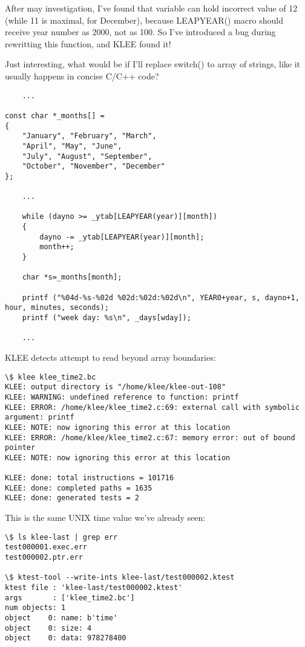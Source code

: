 After may investigation, I've found that  variable can hold incorrect value of 12 (while 11 is maximal, for December), 
because LEAPYEAR() macro should receive year number as 2000, not as 100.
So I've introduced a bug during rewritting this function, and KLEE found it!

Just interesting, what would be if I'll replace switch() to array of strings, like it usually happens in concise C/C++ code?

\begin{lstlisting}
	...

const char *_months[] =
{
	"January", "February", "March",
	"April", "May", "June",
	"July", "August", "September",
	"October", "November", "December"
};

	...

	while (dayno >= _ytab[LEAPYEAR(year)][month])
	{
		dayno -= _ytab[LEAPYEAR(year)][month];
		month++;
	}
	
	char *s=_months[month];

	printf ("%04d-%s-%02d %02d:%02d:%02d\n", YEAR0+year, s, dayno+1, hour, minutes, seconds);
	printf ("week day: %s\n", _days[wday]);	
	
	...

\end{lstlisting}

KLEE detects attempt to read beyond array boundaries:

\begin{lstlisting}
\$ klee klee_time2.bc
KLEE: output directory is "/home/klee/klee-out-108"
KLEE: WARNING: undefined reference to function: printf
KLEE: ERROR: /home/klee/klee_time2.c:69: external call with symbolic argument: printf
KLEE: NOTE: now ignoring this error at this location
KLEE: ERROR: /home/klee/klee_time2.c:67: memory error: out of bound pointer
KLEE: NOTE: now ignoring this error at this location

KLEE: done: total instructions = 101716
KLEE: done: completed paths = 1635
KLEE: done: generated tests = 2
\end{lstlisting}

This is the same UNIX time value we've already seen:

\begin{lstlisting}
\$ ls klee-last | grep err
test000001.exec.err
test000002.ptr.err

\$ ktest-tool --write-ints klee-last/test000002.ktest
ktest file : 'klee-last/test000002.ktest'
args       : ['klee_time2.bc']
num objects: 1
object    0: name: b'time'
object    0: size: 4
object    0: data: 978278400
\end{lstlisting}

